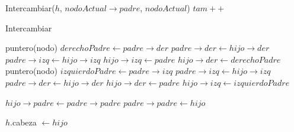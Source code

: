 \begin{Algoritmos}
\begin{algorithm}
\begin{algorithmic}[1]

    Intercambiar($h$, $nodoActual \to padre$, $nodoActual$)
    \EndWhile
   \EndIf
  \State $tam++$
 \EndProcedure
\end{algorithmic}
\end{algorithm}





\begin{algorithm}
\caption{Intercambiar}
\begin{algorithmic}[1]
    \State puntero(nodo) $derechoPadre \gets padre \to der$
    \State $padre \to der \gets hijo \to der$
    \State $padre \to izq \gets hijo \to izq$
    \State $hijo \to izq \gets padre$
    \State $hijo \to der \gets derechoPadre$
  \Else
    \State puntero(nodo) $izquierdoPadre \gets padre \to izq$
    \State $padre \to izq \gets hijo \to izq$
    \State $padre \to der \gets hijo \to der$
    \State $hijo \to der \gets padre$
    \State $hijo \to izq \gets izquierdoPadre$
  \EndIf

  \State $hijo \to padre \gets padre \to padre$
  \State $padre \to padre \gets hijo$
  
    \State$h$.cabeza $\gets hijo$
  \EndIf 


 \EndProcedure
\end{algorithmic}
\end{algorithm}










\end{Algoritmos}











